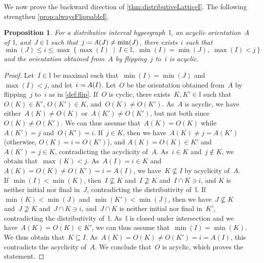 \documentclass{amsart}
\newtheorem{proposition}[theorem]{Proposition}
\theoremstyle{definition}
\newcommand{\set}[2]{\left\{ #1 \;\middle|\; #2 \right\}} %
\newcommand{\eqdef}{\mbox{\,\raisebox{0.2ex}{\scriptsize\ensuremath{\mathrm:}}\ensuremath{=}\,}} %
\newcommand{\II}{\mathbb I} %
\begin{document}
We now prove the backward direction of \cref{thm:distributiveLatticeI}.
The following strengthen \cref{prop:alwaysFlippableI}.

\begin{proposition}
\label{prop:alwaysFlippableDistributive}
For a distributive interval hypergraph~$\II$, an acyclic orientation~$A$ of~$\II$, and~${J \in \II}$ such that~$j \eqdef A(J) \ne \min(J)$, there exists~$i$ such that
\[
\min(J) \le i \le \max\set{\max(I)}{I \in \II, \; \min(I) = \min(J), \; \max(I) < j}
\]
and the orientation obtained from~$A$ by flipping~$j$ to~$i$ is acyclic.
\end{proposition}

\begin{proof}
Let~$I \in \II$ be maximal such that~$\min(I) = \min(J)$ and~$\max(I) < j$, and let~$i \eqdef A(I)$.
Let~$O$ be the orientation obtained from~$A$ by flipping~$j$ to~$i$ as in \cref{def:flip}.
If~$O$ is cyclic, there exists~$K,K' \in \II$ such that~$O(K) \in K'$, $O(K') \in K$, and~$O(K) \ne O(K')$.
As~$A$ is acyclic, we have either~$A(K) \ne O(K)$ or~$A(K') \ne O(K')$, but not both since~$O(K) \ne O(K')$.
We can thus assume that~$A(K) = O(K)$ while $A(K') = j$ and~$O(K') = i$.
If~$j \in K$, then we have~$A(K) \ne j = A(K')$ (otherwise, $O(K) = i = O(K')$), and $A(K) = O(K) \in K'$ and~$A(K') = j \in K$, contradicting the acyclicity of~$A$.
As~$i \in K$ and~$j \notin K$, we obtain that~$\max(K) < j$.
As~$A(I) = i \in K$ and~$A(K) = O(K) \ne O(K') = i = A(I)$, we have~$K \not\subseteq I$ by acyclicity of~$A$.
If~$\min(I) < \min(K)$, then~$I \not\subseteq K$ and~$I \not\supseteq K$ and~$I \cap K \ni i$, and $K$ is neither initial nor final in~$J$, contradicting the distributivity of~$\II$.
If~$\min(K) < \min(J)$ and~$\min(K') < \min(J)$, then we have~$J \not\subseteq K$ and~$J \not\supseteq K$ and~$J \cap K \ni i$, and~$J \cap K$ is neither initial nor final in~$K'$, contradicting the distributivity of~$\II$.
As~$\II$ is closed under intersection and we have~$A(K) = O(K) \in K'$, we can thus assume that~$\min(I) = \min(K)$.
We thus obtain that~$K \subseteq I$.
As~$A(K) = O(K) \ne O(K') = i = A(I)$, this contradicts the acyclicity of~$A$.
We conclude that~$O$ is acyclic, which proves the statement.
\end{proof}
\end{document}
